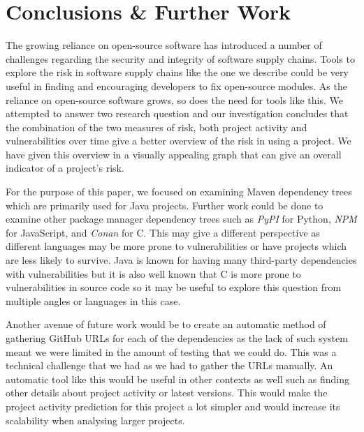 \documentclass[conference]{IEEEtran}
\begin{document}
\section{Conclusions \& Further Work}
The growing reliance on open-source software has introduced a number of challenges regarding the security and integrity of software supply chains. Tools to explore the risk in software supply chains like the one we describe could be very useful in finding and encouraging developers to fix open-source modules. As the reliance on open-source software grows, so does the need for tools like this. We attempted to answer two research question and our investigation concludes that the combination of the two measures of risk, both project activity and vulnerabilities over time give a better overview of the risk in using a project. We have given this overview in a visually appealing graph that can give an overall indicator of a project's risk. 

For the purpose of this paper, we focused on examining Maven dependency trees which are primarily used for Java projects. Further work could be done to examine other package manager dependency trees such as \textit{PyPI} for Python, \textit{NPM} for JavaScript, and \textit{Conan} for C. This may give a different perspective as different languages may be more prone to vulnerabilities or have projects which are less likely to survive. Java is known for having many third-party dependencies with vulnerabilities but it is also well known that C is more prone to vulnerabilities in source code so it may be useful to explore this question from multiple angles or languages in this case. 

Another avenue of future work would be to create an automatic method of gathering GitHub URLs for each of the dependencies as the lack of such system meant we were limited in the amount of testing that we could do. This was a technical challenge that we had as we had to gather the URLs manually. An automatic tool like this would be useful in other contexts as well such as finding other details about project activity or latest versions. This would make the project activity prediction for this project a lot simpler and would increase its scalability when analysing larger projects. 
\end{document}
